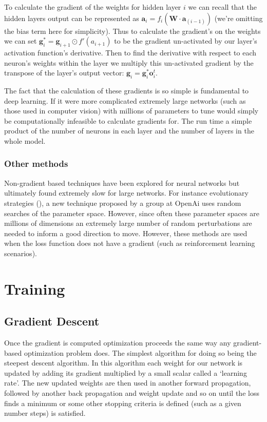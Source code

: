 \documentclass[]{book}
\theoremstyle{definition}
\theoremstyle{definition}
\theoremstyle{definition}
\theoremstyle{remark}
\begin{document}
To calculate the gradient of the weights for hidden layer \(i\) we can
recall that the hidden layers output can be represented as
\(\textbf{a}_i = f_i(\textbf{W}\cdot\textbf{a}_{(i -1)})\) (we're
omitting the bias term here for simplicity). Thus to calculate the
gradient's on the weights we can set
\(\textbf{g}^*_i = \textbf{g}_{i+1} \odot f'(a_{i+1})\) to be the
gradient un-activated by our layer's activation function's derivative.
Then to find the derivative with respect to each neuron's weights within
the layer we multiply this un-activated gradient by the transpose of the
layer's output vector: \(\textbf{g}_i = \textbf{g}^*_i \textbf{o}_i^t\).

The fact that the calculation of these gradients is so simple is
fundamental to deep learning. If it were more complicated extremely
large networks (such as those used in computer vision) with millions of
parameters to tune would simply be computationally infeasible to
calculate gradients for. The run time a simple product of the number of
neurons in each layer and the number of layers in the whole model.

\subsubsection{Other methods}\label{other-methods}

Non-gradient based techniques have been explored for neural networks but
ultimately found extremely slow for large networks. For instance
evolutionary strategies (\citet{evostrat}), a new technique proposed by
a group at OpenAi uses random searches of the parameter space. However,
since often these parameter spaces are millions of dimensions an
extremely large number of random perturbations are needed to inform a
good direction to move. However, these methods are used when the loss
function does not have a gradient (such as reinforcement learning
scenarios).

\section{Training}\label{training}

\subsection{Gradient Descent}\label{gradient-descent}

Once the gradient is computed optimization proceeds the same way any
gradient-based optimization problem does. The simplest algorithm for
doing so being the steepest descent algorithm. In this algorithm each
weight for our network is updated by adding its gradient multiplied by a
small scalar called a `learning rate'. The new updated weights are then
used in another forward propagation, followed by another back
propagation and weight update and so on until the loss finds a minimum
or some other stopping criteria is defined (such as a given number
steps) is satisfied.
\end{document}
